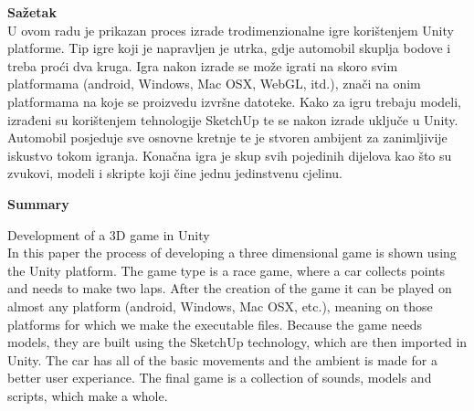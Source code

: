 { \fontsize{16pt}{12pt}\selectfont\bfseries Sažetak}\\
U ovom radu je prikazan proces izrade trodimenzionalne igre korištenjem Unity platforme. Tip igre koji je napravljen je utrka, gdje automobil skuplja bodove i treba proći dva kruga. Igra nakon izrade se može igrati na skoro svim platformama (android, Windows, Mac OSX,  WebGL, itd.), znači na onim platformama na koje se proizvedu izvršne datoteke.  Kako za igru trebaju modeli, izrađeni su korištenjem tehnologije SketchUp te se nakon izrade uključe u Unity. Automobil posjeduje sve osnovne kretnje te je stvoren ambijent za zanimljivije iskustvo tokom igranja. Konačna igra je skup svih pojedinih dijelova kao što su zvukovi, modeli i skripte koji čine jednu jedinstvenu cjelinu.\par
\vspace{10mm}
{ \fontsize{16pt}{14pt}\selectfont\bfseries Summary}\par
{ \fontsize{14pt}{12pt}\selectfont Development of a 3D game in Unity}\\
In this paper the process of developing a three dimensional game is shown using the Unity platform. The game type is a race game, where a car collects points and needs to make two laps. After the creation of the game it can be played on almost any platform (android, Windows, Mac OSX, etc.), meaning on those platforms for which we make the executable files. Because the game needs models, they are built using the SketchUp technology, which are then imported in Unity. The car has all of the basic movements and the ambient is made for a better user experiance. The final game is a collection of sounds, models and scripts, which make a whole.
